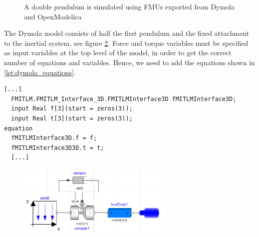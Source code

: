 \documentclass[11pt,a4paper]{report}
\begin{document}
\begin{figure}[ht]
\centering
{}
\caption{A double pendulum is simulated using FMUs exported from Dymola and OpenModelica}
\label{fig:double_pendulum}
\end{figure}

The Dymola model consists of half the first pendulum and the fixed attachment to the inertial system, see figure \cref{fig:model_dymola}.
Force and torque variables must be specified as input variables at the top level of the model, in order to get the correct number of equations and variables.
Hence, we need to add the equations shown in \cref{lst:dymola_equations}.

\begin{lstlisting}[basicstyle=\small\ttfamily, floatplacement=ht,label=lst:dymola_equations,caption=Input variables must be specified on top level in the Modelica models]
  [...]
  FMITLM.FMITLM_Interface_3D.FMITLMInterface3D fMITLMInterface3D;
  input Real f[3](start = zeros(3));
  input Real t[3](start = zeros(3));
equation
  fMITLMInterface3D.f = f;
  fMITLMInterface3D3D.t = t;
  [...]
\end{lstlisting}

\begin{figure}[ht]
\centering
\includegraphics[width=0.65\textwidth]{gfx/model_dymola.png}
\caption{}
\label{fig:model_dymola}
\end{figure}
\end{document}
